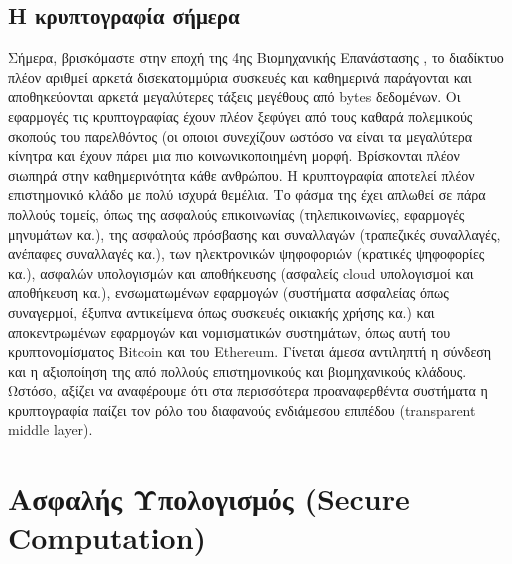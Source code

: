 \subsection{Η κρυπτογραφία σήμερα}
Σήμερα, βρισκόμαστε στην εποχή της 4ης Βιομηχανικής Επανάστασης \cite{drath2014industrie} \cite{skilton20184th}, το διαδίκτυο πλέον αριθμεί αρκετά δισεκατομμύρια συσκευές και καθημερινά παράγονται και αποθηκεύονται αρκετά μεγαλύτερες τάξεις μεγέθους από bytes δεδομένων. Οι εφαρμογές τις κρυπτογραφίας έχουν πλέον ξεφύγει από τους καθαρά πολεμικούς σκοπούς του παρελθόντος (οι οποιοι συνεχίζουν ωστόσο να είναι τα μεγαλύτερα κίνητρα και έχουν πάρει μια πιο κοινωνικοποιημένη μορφή. Βρίσκονται πλέον σιωπηρά στην καθημερινότητα κάθε ανθρώπου. Η κρυπτογραφία αποτελεί πλέον επιστημονικό κλάδο με πολύ ισχυρά θεμέλια. Το φάσμα της έχει απλωθεί σε πάρα πολλούς τομείς, όπως της ασφαλούς επικοινωνίας (τηλεπικοινωνίες, εφαρμογές μηνυμάτων κα.), της ασφαλούς πρόσβασης και συναλλαγών (τραπεζικές συναλλαγές, ανέπαφες συναλλαγές κα.), των ηλεκτρονικών ψηφοφοριών (κρατικές ψηφοφορίες κα.), ασφαλών υπολογισμών και αποθήκευσης (ασφαλείς cloud υπολογισμοί και αποθήκευση κα.), ενσωματωμένων εφαρμογών (συστήματα ασφαλείας όπως συναγερμοί, έξυπνα αντικείμενα όπως συσκευές οικιακής χρήσης κα.) και αποκεντρωμένων εφαρμογών και νομισματικών συστημάτων, όπως αυτή του κρυπτονομίσματος Bitcoin και του Ethereum. Γίνεται άμεσα αντιληπτή η σύνδεση και η αξιοποίηση της από πολλούς επιστημονικούς και βιομηχανικούς κλάδους. Ωστόσο, αξίζει να αναφέρουμε ότι στα περισσότερα προαναφερθέντα συστήματα η κρυπτογραφία παίζει τον ρόλο του διαφανούς ενδιάμεσου επιπέδου (transparent middle layer).

\section{Ασφαλής Υπολογισμός (Secure Computation)}

